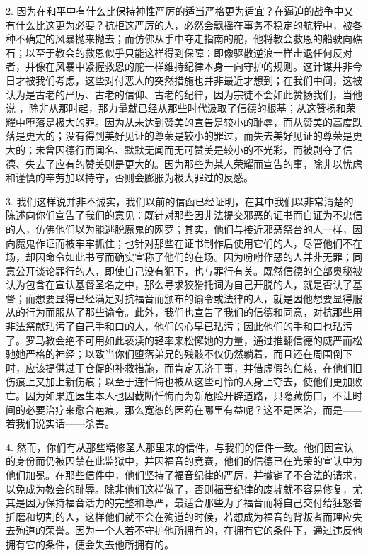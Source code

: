 2. 因为在和平中有什么比保持神性严厉的适当严格更为适宜？在逼迫的战争中又有什么比这更为必要？抗拒这严厉的人，必然会飘摇在事务不稳定的航程中，被各种不确定的风暴抛来抛去；而仿佛从手中夺走指南的舵，他将教会救恩的船驶向礁石；以至于教会的救恩似乎只能这样得到保障：即像驱散逆浪一样击退任何反对者，并像在风暴中紧握救恩的舵一样维持纪律本身一向守护的规则。这计谋并非今日才被我们考虑，这些对付恶人的突然措施也并非最近才想到；在我们中间，这被认为是古老的严厉、古老的信仰、古老的纪律，因为宗徒不会如此赞扬我们，当他说 ，除非从那时起，那力量就已经从那些时代汲取了信德的根基；从这赞扬和荣耀中堕落是极大的罪。因为从未达到赞美的宣告是较小的耻辱，而从赞美的高度跌落是更大的；没有得到美好见证的尊荣是较小的罪过，而失去美好见证的尊荣是更大的；未曾因德行而闻名、默默无闻而无可赞美是较小的不光彩，而被剥夺了信德、失去了应有的赞美则是更大的。因为那些为某人荣耀而宣告的事，除非以忧虑和谨慎的辛劳加以持守，否则会膨胀为极大罪过的反感。\par

3. 我们这样说并非不诚实，我们以前的信函已经证明，在其中我们以非常清楚的陈述向你们宣告了我们的意见：既针对那些因非法提交邪恶的证书而自证为不忠信的人，仿佛他们以为能逃脱魔鬼的网罗；其实，他们与接近邪恶祭台的人一样，因向魔鬼作证而被牢牢抓住；也针对那些在证书制作后使用它们的人，尽管他们不在场，却因命令如此书写而确实宣称了他们的在场。因为吩咐作恶的人并非无罪；同意公开谈论罪行的人，即使自己没有犯下，也与罪行有关。既然信德的全部奥秘被认为包含在宣认基督圣名之中，那么寻求狡猾托词为自己开脱的人，就是否认了基督；而想要显得已经满足对抗福音而颁布的谕令或法律的人，就是因他想要显得服从的行为而服从了那些谕令。此外，我们也宣告了我们的信德和同意，对抗那些用非法祭献玷污了自己手和口的人，他们的心早已玷污；因此他们的手和口也玷污了。罗马教会绝不可用如此亵渎的轻率来松懈她的力量，通过推翻信德的威严而松驰她严格的神经；以致当你们堕落弟兄的残骸不仅仍然躺着，而且还在周围倒下时，应该提供过于仓促的补救措施，而肯定无济于事，并借虚假的仁慈，在他们旧伤痕上又加上新伤痕；以至于连忏悔也被从这些可怜的人身上夺去，使他们更加败亡。因为如果连医生本人也因截断忏悔而为新危险开辟道路，只隐藏伤口，不让时间的必要治疗来愈合疤痕，那么宽恕的医药在哪里有益呢？这不是医治，而是——若我们说实话——杀害。\par

4. 然而，你们有从那些精修圣人那里来的信件，与我们的信件一致。他们因宣认的身份而仍被囚禁在此监狱中，并因福音的竞赛，他们的信德已在光荣的宣认中为他们加冕。在那些信件中，他们坚持了福音纪律的严厉，并撤销了不合法的请求，以免成为教会的耻辱。除非他们这样做了，否则福音纪律的废墟就不容易修复，尤其是因为保持福音活力的完整和尊严，最适合那些为了福音而将自己交付给狂怒者折磨和切割的人，这样他们就不会在殉道的时候，若想成为福音的背叛者而理应失去殉道的荣誉。因为一个人若不守护他所拥有的，在拥有它的条件下，通过违反他拥有它的条件，便会失去他所拥有的。\par

